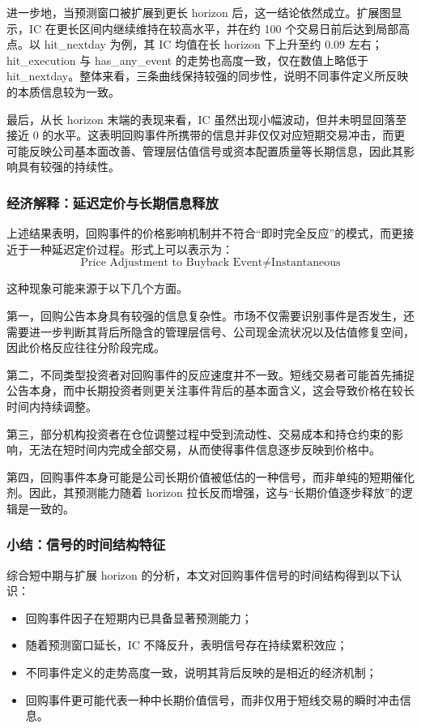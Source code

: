 \documentclass[a4paper,10pt]{article}
\begin{document}
进一步地，当预测窗口被扩展到更长 horizon 后，这一结论依然成立。扩展图显示，IC 在更长区间内继续维持在较高水平，并在约 100 个交易日前后达到局部高点。以 hit\_nextday 为例，其 IC 均值在长 horizon 下上升至约 0.09 左右；hit\_execution 与 has\_any\_event 的走势也高度一致，仅在数值上略低于 hit\_nextday。整体来看，三条曲线保持较强的同步性，说明不同事件定义所反映的本质信息较为一致。

最后，从长 horizon 末端的表现来看，IC 虽然出现小幅波动，但并未明显回落至接近 0 的水平。这表明回购事件所携带的信息并非仅仅对应短期交易冲击，而更可能反映公司基本面改善、管理层估值信号或资本配置质量等长期信息，因此其影响具有较强的持续性。

\subsubsection{经济解释：延迟定价与长期信息释放}

上述结果表明，回购事件的价格影响机制并不符合“即时完全反应”的模式，而更接近于一种延迟定价过程。形式上可以表示为：
\begin{equation}
\text{Price Adjustment to Buyback Event} \neq \text{Instantaneous}
\end{equation}

这种现象可能来源于以下几个方面。

第一，回购公告本身具有较强的信息复杂性。市场不仅需要识别事件是否发生，还需要进一步判断其背后所隐含的管理层信号、公司现金流状况以及估值修复空间，因此价格反应往往分阶段完成。

第二，不同类型投资者对回购事件的反应速度并不一致。短线交易者可能首先捕捉公告本身，而中长期投资者则更关注事件背后的基本面含义，这会导致价格在较长时间内持续调整。

第三，部分机构投资者在仓位调整过程中受到流动性、交易成本和持仓约束的影响，无法在短时间内完成全部交易，从而使得事件信息逐步反映到价格中。

第四，回购事件本身可能是公司长期价值被低估的一种信号，而非单纯的短期催化剂。因此，其预测能力随着 horizon 拉长反而增强，这与“长期价值逐步释放”的逻辑是一致的。

\subsubsection{小结：信号的时间结构特征}

综合短中期与扩展 horizon 的分析，本文对回购事件信号的时间结构得到以下认识：

\begin{itemize}
    \item 回购事件因子在短期内已具备显著预测能力；
    \item 随着预测窗口延长，IC 不降反升，表明信号存在持续累积效应；
    \item 不同事件定义的走势高度一致，说明其背后反映的是相近的经济机制；
    \item 回购事件更可能代表一种中长期价值信号，而非仅用于短线交易的瞬时冲击信息。
\end{itemize}
\end{document}
